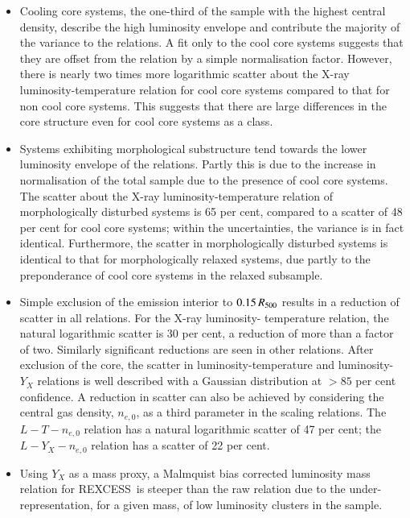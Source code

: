\documentclass[oldversion]{aa}
\newcommand{\rexcess}{{\gwpfont REXCESS}}
\begin{document}
\begin{itemize}
\item Cooling core systems, the one-third of the sample with the highest central density, describe the high luminosity envelope and contribute the majority of the variance to
  the relations. A fit only to the cool core systems suggests that
  they are offset from the relation by a simple normalisation
  factor. However, there is nearly two times more logarithmic scatter about
  the X-ray luminosity-temperature relation for cool core systems compared
  to that for non cool core systems. This suggests that there are
  large differences in the core structure even for cool core systems
  as a class. 

\item Systems exhibiting morphological substructure tend towards the
  lower luminosity envelope of the relations. Partly this is due to the increase
  in normalisation of the total sample due to the presence of cool core
  systems. The scatter about the X-ray luminosity-temperature relation
  of morphologically disturbed systems is 65 per cent, compared to a scatter of 48 per cent for cool core systems; within the uncertainties, the variance is in fact identical. Furthermore, the scatter in morphologically disturbed
  systems is identical to that for morphologically relaxed systems, due partly to the preponderance of cool core systems in the relaxed subsample.

\item Simple exclusion of the emission interior to $0.15\,R_{500}$ results
  in a reduction of scatter in all relations. For the X-ray luminosity-
  temperature relation, the natural logarithmic scatter is 30 per cent, a
  reduction of more than a factor of two. Similarly significant 
  reductions are seen in  other relations. After exclusion of the core, the scatter in luminosity-temperature and luminosity-$Y_X$ relations is well described with a Gaussian distribution at $> 85$ per cent confidence. A reduction in scatter can also be achieved by considering
  the central gas density, $n_{e,0}$, as a third parameter in the
  scaling relations. The $L-T-n_{e,0}$ relation has a natural logarithmic
  scatter of 47 per cent; the $L-Y_X-n_{e,0}$ relation has a scatter of 22 per cent.

\item Using $Y_X$ as a mass proxy, a Malmquist bias corrected luminosity mass relation for \rexcess\ is steeper than the raw relation due to the under-representation, for a given mass, of low luminosity clusters in the sample. 

\end{itemize}
\end{document}
